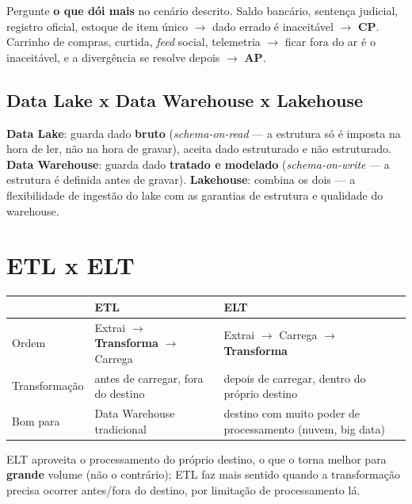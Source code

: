 \begin{regrapratica}
Pergunte \textbf{o que dói mais} no cenário descrito. Saldo bancário,
sentença judicial, registro oficial, estoque de item único $\to$ dado
errado é inaceitável $\to$ \textbf{CP}. Carrinho de compras, curtida,
\textit{feed} social, telemetria $\to$ ficar fora do ar é o inaceitável, e
a divergência se resolve depois $\to$ \textbf{AP}.
\end{regrapratica}

\subsection{Data Lake x Data Warehouse x Lakehouse}

\begin{conceito}
\textbf{Data Lake}: guarda dado \textbf{bruto} (\textit{schema-on-read}
--- a estrutura só é imposta na hora de ler, não na hora de gravar),
aceita dado estruturado e não estruturado. \textbf{Data Warehouse}: guarda
dado \textbf{tratado e modelado} (\textit{schema-on-write} --- a estrutura
é definida antes de gravar). \textbf{Lakehouse}: combina os dois --- a
flexibilidade de ingestão do lake com as garantias de estrutura e
qualidade do warehouse.
\end{conceito}

\section{ETL x ELT}

\begin{conceito}
\begin{center}
\begin{tabular}{@{}p{2.6cm}p{4.3cm}p{4.3cm}@{}}
\toprule
& \textbf{ETL} & \textbf{ELT} \\
\midrule
Ordem & Extrai $\to$ \textbf{Transforma} $\to$ Carrega & Extrai $\to$
Carrega $\to$ \textbf{Transforma} \\
Transformação & antes de carregar, fora do destino & depois de carregar,
dentro do próprio destino \\
Bom para & Data Warehouse tradicional & destino com muito poder de
processamento (nuvem, big data) \\
\bottomrule
\end{tabular}
\end{center}
ELT aproveita o processamento do próprio destino, o que o torna melhor
para \textbf{grande} volume (não o contrário); ETL faz mais sentido
quando a transformação precisa ocorrer antes/fora do destino, por
limitação de processamento lá.
\end{conceito}

